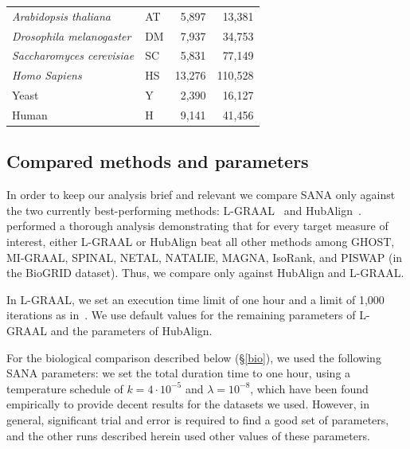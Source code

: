 \documentclass{bioinfo}
\begin{document}
\begin{table}[h]
\begin{tabular}{llrr}
\textit{Arabidopsis thaliana}      & AT                  & 5,897                                 & 13,381                                    \\
\textit{Drosophila melanogaster}   & DM                  & 7,937                                 & 34,753                                    \\
\textit{Saccharomyces cerevisiae}      & SC                  & 5,831                                 & 77,149                                    \\
\textit{Homo Sapiens}   & HS                  & 13,276                                 & 110,528                                   \\ \hline
Yeast                              & Y                   & 2,390                                 & 16,127                                    \\
Human                              & H                   & 9,141                                 & 41,456                                    \\ \hline
\end{tabular}
\end{table}

\subsection{Compared methods and parameters}

In order to keep our analysis brief and relevant we compare SANA only against the two currently best-performing methods: L-GRAAL~\citep{LGRAAL} and HubAlign~\citep{HubAlign}. \cite{LGRAAL} performed a thorough analysis demonstrating that for every target measure of interest, either L-GRAAL or HubAlign beat all other methods among GHOST, MI-GRAAL, SPINAL, NETAL, NATALIE, MAGNA, IsoRank, and PISWAP (in the BioGRID dataset). Thus, we compare only against HubAlign and L-GRAAL.

In L-GRAAL, we set an execution time limit of one hour and a limit of 1,000 iterations as in~\citep{LGRAAL}. We use default values for the remaining parameters of L-GRAAL and the parameters of HubAlign.

For the biological comparison described below (\S \ref{bio}), we used the following SANA parameters: we set the total duration time to one hour, using 
a temperature schedule of $k=4\cdot 10^{-5}$ and $\lambda=10^{-8}$, which have been found empirically to provide decent results for the datasets we used. However, in general, significant trial and error is required to find a good set of parameters, and the other runs described herein used other values of these parameters. %
\end{document}
